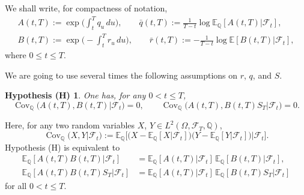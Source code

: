 \documentclass[11pt]{article}
\newtheorem*{hyp}{Hypothesis (H)}
\theoremstyle{remark}
\newcommand{\E}{\mathbb{E}}
\newcommand{\cF}{\mathcal{F}}
\newcommand{\Q}{\mathbb{Q}}
\begin{document}
We shall write, for compactness of notation,
\begin{gather*}
A(t,T) := \exp\biggl(\int_t^T q_u\,du\biggr),
\qquad \bar{q}(t,T) := \frac{1}{T-t} \log \E_\Q[A(t,T)\vert\cF_t],\\
B(t,T) := \exp\biggl(-\int_t^T r_u\,du\biggr),
\qquad
\bar{r}(t,T) := - \frac{1}{T-t} \log \E[B(t,T)\vert\cF_t],
\end{gather*}
where $0 \leq t \leq T$.

We are going to use several times the following assumptions on $r$,
$q$, and $S$.
\begin{hyp}
  One has, for any $0 < t \leq T$,
  \[
  \operatorname{Cov}_{\Q}\bigl(A(t,T),B(t,T) \big\vert \cF_t\bigr) = 0, 
  \qquad
  \operatorname{Cov}_{\Q}\bigl(A(t,T),B(t,T)S_T \big\vert \cF_t\bigr) = 0.
  \]
\end{hyp}
\noindent Here, for any two random variables $X$, $Y \in L^2(\Omega,\cF_T,\Q)$,
\[
\operatorname{Cov}_\Q\bigl(X,Y \big\vert \cF_t \bigr) :=
\E_\Q\bigl[ \bigl( X - \E_\Q[X\vert\cF_t] \bigr)
\bigl( Y - \E_\Q[Y\vert\cF_t] \bigr)
  \big\vert \cF_t \bigr].
\]
Hypothesis (H) is equivalent to
\begin{align*}
\E_\Q[A(t,T) B(t,T) \vert \cF_t] &= \E_\Q[A(t,T) \vert \cF_t]
\, \E_\Q[B(t,T) \vert \cF_t],\\
\E_\Q[A(t,T) B(t,T) S_T \vert \cF_t] &= \E_\Q[A(t,T) \vert \cF_t]
\, \E_\Q[B(t,T) S_T \vert \cF_t]
\end{align*}
for all $0 < t \leq T$.
\end{document}

